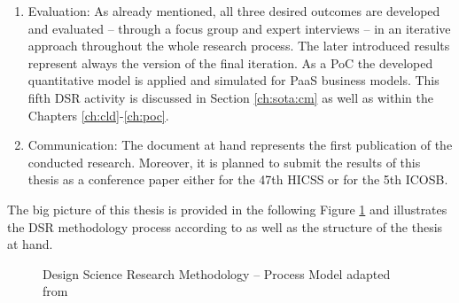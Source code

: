\begin{enumerate}
	\item Evaluation: As already mentioned, all three desired outcomes are developed and evaluated -- through a focus group and expert interviews -- in an iterative approach throughout the whole research process. The later introduced results represent always the version of the final iteration. As a \ac{PoC} the developed quantitative model is applied and simulated for \ac{PaaS} business models. This fifth \ac{DSR} activity is discussed in Section \ref{ch:sota:cm} as well as within the Chapters \ref{ch:cld}-\ref{ch:poc}.
	\item Communication: The document at hand represents the first publication of the conducted research. Moreover, it is planned to submit the results of this thesis as a conference paper either for the 47th \ac{HICSS} or for the 5th \ac{ICOSB}.
\end{enumerate}

The big picture of this thesis is provided in the following Figure \ref{fig:dsrm} and illustrates the \ac{DSR} methodology process according to \citet{Peffers2007} as well as the structure of the thesis at hand.

\begin{figure}[t]
	\centering
	
	\caption[Design Science Research Methodology -- Process Model]{Design Science Research Methodology -- Process Model adapted from \citet[p. 54]{Peffers2007}}
	\label{fig:dsrm}
\end{figure}